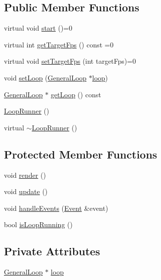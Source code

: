 \subsection*{Public Member Functions}
\begin{DoxyCompactItemize}
\item 
virtual void \hyperlink{classZeta_1_1LoopRunner_a45c0f0ec5b7d1f48f3aebc429908c456}{start} ()=0
\item 
virtual int \hyperlink{classZeta_1_1LoopRunner_ab9ab29d4239c98b49e11879528817dc3}{get\+Target\+Fps} () const =0
\item 
virtual void \hyperlink{classZeta_1_1LoopRunner_a82d681fc778e4eb3078c8dc0eac059a0}{set\+Target\+Fps} (int target\+Fps)=0
\item 
void \hyperlink{classZeta_1_1LoopRunner_ad0ef83982d819b87a6e5c71a9bbd11b0}{set\+Loop} (\hyperlink{classZeta_1_1GeneralLoop}{General\+Loop} $\ast$\hyperlink{classZeta_1_1LoopRunner_a6ba0f28d22a7645ad1edc49ab9c1e732}{loop})
\item 
\hyperlink{classZeta_1_1GeneralLoop}{General\+Loop} $\ast$ \hyperlink{classZeta_1_1LoopRunner_a11df692d8d810585a35379fb8fb306a3}{get\+Loop} () const 
\item 
\hyperlink{classZeta_1_1LoopRunner_a6a811a3c856aacf2bfe759c877d91e95}{Loop\+Runner} ()
\item 
virtual \hyperlink{classZeta_1_1LoopRunner_a27027688ab6f384cfcf5198eae43a69a}{$\sim$\+Loop\+Runner} ()
\end{DoxyCompactItemize}
\subsection*{Protected Member Functions}
\begin{DoxyCompactItemize}
\item 
void \hyperlink{classZeta_1_1LoopRunner_af7d8607eb7de15f7463809ee16254f33}{render} ()
\item 
void \hyperlink{classZeta_1_1LoopRunner_a19daf63249a85380485ff0c98bd16e09}{update} ()
\item 
void \hyperlink{classZeta_1_1LoopRunner_a1095c1b13cf9909e895d9777fb20fec7}{handle\+Events} (\hyperlink{classZeta_1_1Event}{Event} \&event)
\item 
bool \hyperlink{classZeta_1_1LoopRunner_a06d8692924dc367d965c2da59f20cd5c}{is\+Loop\+Running} ()
\end{DoxyCompactItemize}
\subsection*{Private Attributes}
\begin{DoxyCompactItemize}
\item 
\hyperlink{classZeta_1_1GeneralLoop}{General\+Loop} $\ast$ \hyperlink{classZeta_1_1LoopRunner_a6ba0f28d22a7645ad1edc49ab9c1e732}{loop}
\end{DoxyCompactItemize}


